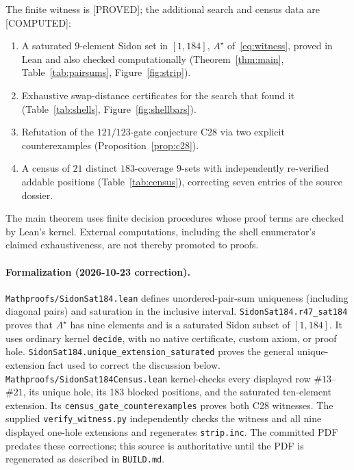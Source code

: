 \documentclass[11pt,a4paper]{article}
\theoremstyle{definition}
\begin{document}
The finite witness is [PROVED]; the additional search and census data
are [COMPUTED]:
\begin{enumerate}
\item A saturated $9$-element Sidon set in $[1,184]$,
  $A^\star$ of~\eqref{eq:witness}, proved in Lean and also checked
  computationally (Theorem~\ref{thm:main}, Table~\ref{tab:pairsums},
  Figure~\ref{fig:strip}).
\item Exhaustive swap-distance certificates for the search that found it
  (Table~\ref{tab:shells}, Figure~\ref{fig:shellbars}).
\item Refutation of the $121/123$-gate conjecture C28 via two explicit
  counterexamples (Proposition~\ref{prop:c28}).
\item A census of $21$ distinct $183$-coverage $9$-sets with independently
  re-verified addable positions (Table~\ref{tab:census}), correcting
  seven entries of the source dossier.
\end{enumerate}
The main theorem uses finite decision procedures whose proof terms are
checked by Lean's kernel. External computations, including the shell
enumerator's claimed exhaustiveness, are not thereby promoted to proofs.

\paragraph{Formalization (2026-10-23 correction).}
\texttt{Mathproofs/SidonSat184.lean} defines unordered-pair-sum uniqueness
(including diagonal pairs) and saturation in the inclusive interval.
\texttt{SidonSat184.r47\_sat184} proves that $A^\star$ has nine elements
and is a saturated Sidon subset of $[1,184]$. It uses ordinary kernel
\texttt{decide}, with no native certificate, custom axiom, or proof hole.
\texttt{SidonSat184.unique\_extension\_saturated} proves the general
unique-extension fact used to correct the discussion below.
\texttt{Mathproofs/SidonSat184Census.lean} kernel-checks every displayed
row $\#13$--$\#21$, its unique hole, its 183 blocked positions, and the
saturated ten-element extension. Its
\texttt{census\_gate\_counterexamples} proves both C28 witnesses.
The supplied
\texttt{verify\_witness.py} independently checks the witness and all nine
displayed one-hole extensions and regenerates \texttt{strip.inc}.
The committed PDF predates these corrections; this source is authoritative
until the PDF is regenerated as described in \texttt{BUILD.md}.

\end{document}
